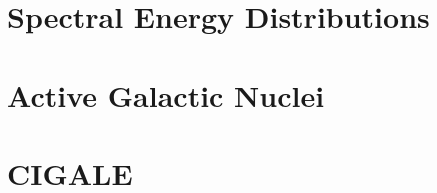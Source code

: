 \section{Spectral Energy Distributions}
\lipsum[1]

\section{Active Galactic Nuclei}

\section{CIGALE}